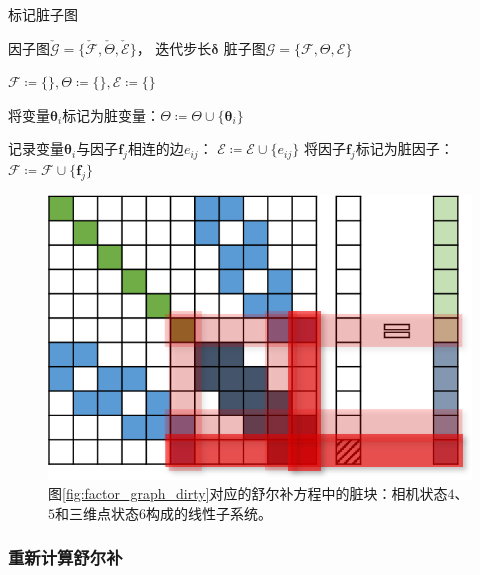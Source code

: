 \begin{algorithm}
\caption{标记脏子图}
\begin{algorithmic}
    \REQUIRE 因子图$\check{\mathcal{G}}=\{\check{\mathcal{F}},\check{\Theta},\check{\mathcal{E}}\}$，
             迭代步长$\bm{\delta}$
    \ENSURE 脏子图$\mathcal{G}=\{\mathcal{F},\Theta,\mathcal{E}\}$

    \STATE $\mathcal{F}\coloneqq\{\},\Theta\coloneqq\{\},\mathcal{E}\coloneqq\{\}$

        \STATE 将变量$\bm{\theta}_i$标记为脏变量：$\Theta\coloneqq\Theta\cup\{\bm{\theta}_i\}$

        \STATE 记录变量$\bm{\theta}_i$与因子$\mathbf{f}_j$相连的边$e_{ij}$：
               $\mathcal{E} \coloneqq \mathcal{E} \cup \{e_{ij}\}$
        \STATE 将因子$\mathbf{f}_j$标记为脏因子：
               $\mathcal{F} \coloneqq \mathcal{F} \cup \{\mathbf{f}_j\}$
        \ENDFOR

    \ENDFOR
\end{algorithmic}
\label{alg:mark_dirty}
\end{algorithm}

\begin{figure}[htb!]
    \centering
    \includegraphics{figs/normal_eq_dirty.png}
    \caption{图\ref{fig:factor_graph_dirty}对应的舒尔补方程中的脏块：相机状态$4$、$5$和三维点状态$6$构成的线性子系统。}
    \label{fig:normal_eq_dirty}
\end{figure}

\subsubsection*{重新计算舒尔补}

